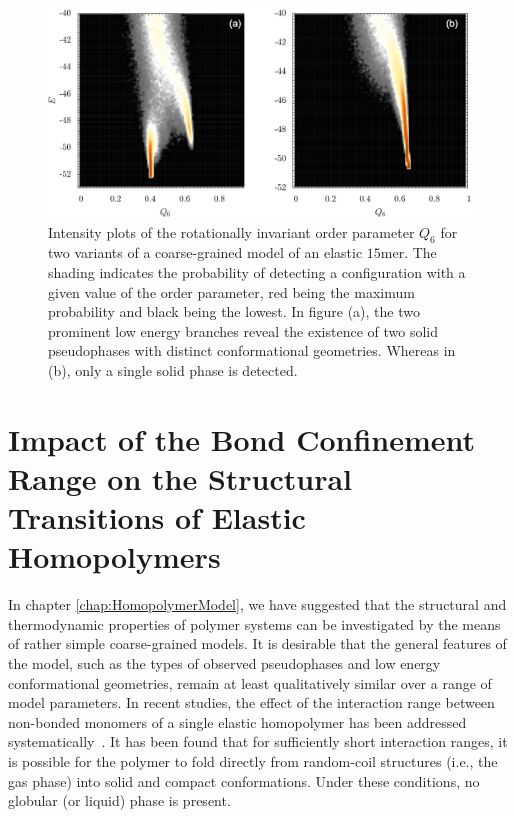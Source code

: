 \documentclass[12pt]{report}
\begin{document}
\begin{figure}
\center
\includegraphics[width = 1.01\textwidth]{chapter4Figs/q6.eps}
\caption{\label{fig:orderParameters}%
Intensity plots of the rotationally invariant order parameter $Q_{6}$ for two variants of a coarse-grained model of an elastic $15$mer. The shading indicates the probability of detecting a configuration with a given value of the order parameter, red being the maximum probability and black being the lowest. In figure (a), the two prominent low energy branches reveal the existence of two solid pseudophases with distinct conformational geometries. Whereas in (b), only a single solid phase is detected.
}
\end{figure}
% 










\chapter{Impact of the Bond Confinement Range on the Structural Transitions of Elastic Homopolymers}
\label{chap:bondFluct}

In chapter \ref{chap:HomopolymerModel}, we have suggested that the structural and thermodynamic properties of polymer systems can be investigated by the means of rather simple coarse-grained models. It is desirable that the general features of the model, such as the types of observed pseudophases and low energy conformational geometries, remain at least qualitatively similar over a range of model parameters. In recent studies, the effect of the interaction range between non-bonded monomers of a single elastic homopolymer has been addressed systematically~\cite{taylorRange1,taylorRange2,Gross2013}. It has been found that for sufficiently short interaction ranges, it is possible for the polymer to fold directly from random-coil structures (i.e., the gas phase) into solid and compact conformations. Under these conditions, no globular (or liquid) phase is present.
\end{document}
